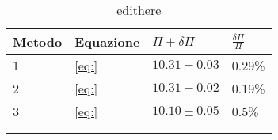 \begin{longtable}{@{}llll@{}}
\toprule
Metodo & Equazione & $\Pi \pm \delta \Pi$ & $\frac{\delta \Pi}{\Pi}$ \tabularnewline
\midrule
1 & \ref{eq:} & $10.31 \pm 0.03$ & 0.29\% \tabularnewline
2 & \ref{eq:} & $10.31 \pm 0.02$ & 0.19\% \tabularnewline
3 & \ref{eq:} & $10.10 \pm 0.05$ & 0.5\% \tabularnewline
\bottomrule
\label{tab:edithere}
\\
\caption{edithere}
\end{longtable}
